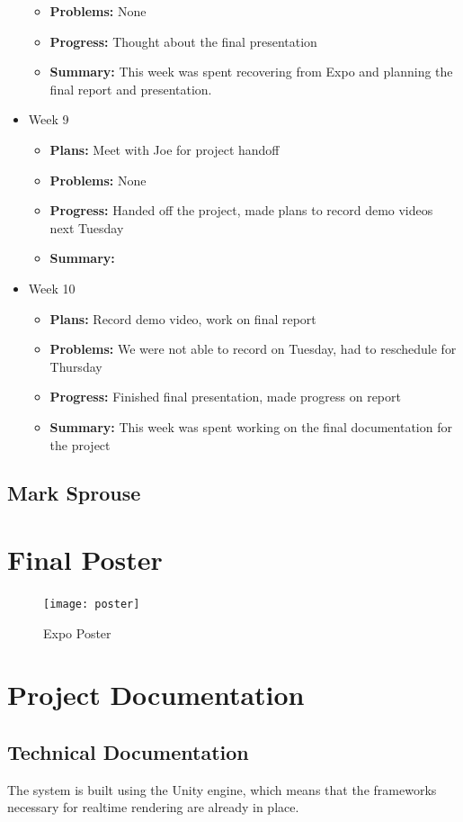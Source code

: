 \documentclass[onecolumn, draftclsnofoot,10pt, compsoc]{IEEEtran}
\def \GroupMemberThree{			Mark Sprouse			}
\begin{document}
\begin{itemize}
\begin{itemize}
    \item \textbf{Problems:} None
    \item \textbf{Progress:} Thought about the final presentation
    \item \textbf{Summary:} This week was spent recovering from Expo and planning the final report and presentation.
	\end{itemize}
\item Week 9
	\begin{itemize}
	\item \textbf{Plans:} Meet with Joe for project handoff
    \item \textbf{Problems:} None
    \item \textbf{Progress:} Handed off the project, made plans to record demo videos next Tuesday
    \item \textbf{Summary:}
	\end{itemize}
\item Week 10
	\begin{itemize}
	\item \textbf{Plans:} Record demo video, work on final report
    \item \textbf{Problems:} We were not able to record on Tuesday, had to reschedule for Thursday
    \item \textbf{Progress:} Finished final presentation, made progress on report
    \item \textbf{Summary:} This week was spent working on the final documentation for the project
	\end{itemize}
\end{itemize}
\subsection{\GroupMemberThree}


\section{Final Poster}
\begin{figure}[H]
	\centering
	\texttt{[image: poster]}
    \caption{Expo Poster}
    \label{fig:expoposter}
\end{figure}

\section{Project Documentation}
\subsection{Technical Documentation}
The system is built using the Unity engine, which means that the frameworks necessary for realtime rendering are already in place. 
\end{document}
